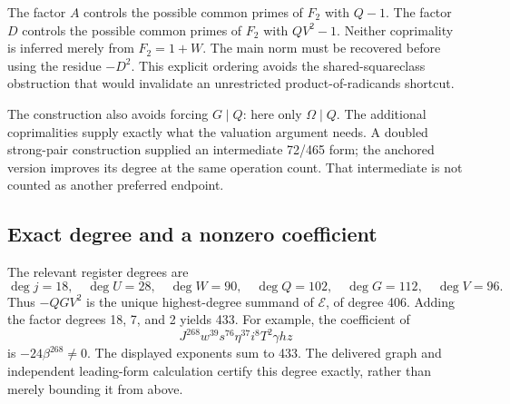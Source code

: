 The factor $A$ controls the possible common primes of $F_2$ with $Q-1$.
The factor $D$ controls the possible common primes of $F_2$ with $QV^2-1$.
Neither coprimality is inferred merely from $F_2=1+W$.
The main norm must be recovered before using the residue $-D^2$.
This explicit ordering avoids the shared-squareclass obstruction that would
invalidate an unrestricted product-of-radicands shortcut.

The construction also avoids forcing $G\mid Q$: here only $\Omega\mid Q$.
The additional coprimalities supply exactly what the valuation argument
needs. A doubled strong-pair construction supplied an intermediate 72/465
form; the anchored version improves its degree at the same operation count.
That intermediate is not counted as another preferred endpoint.

\subsection{Exact degree and a nonzero coefficient}

The relevant register degrees are
\[
\deg j=18,\quad\deg U=28,\quad\deg W=90,\quad\deg Q=102,
\quad\deg G=112,\quad\deg V=96.
\]
Thus $-QGV^2$ is the unique highest-degree summand of $\mathcal E$, of
degree 406. Adding the factor degrees 18, 7, and 2 yields 433.
For example, the coefficient of
\[
J^{268}w^{39}s^{76}\eta^{37}i^8T^2\gamma hz
\]
is $-24\beta^{268}\ne0$. The displayed exponents sum to 433.
The delivered graph and independent leading-form calculation certify this
degree exactly, rather than merely bounding it from above.
